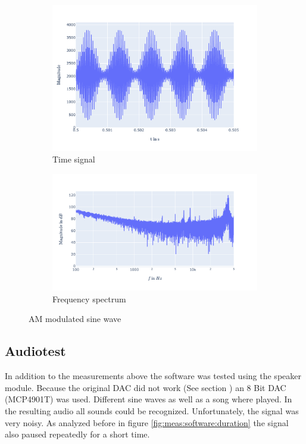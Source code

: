 \begin{figure}
  \centering
  \begin{subfigure}[b]{0.8\textwidth}
    \includegraphics[width=\textwidth]{src/assets/pictures/measurements/software_am_time.pdf}
    \caption{Time signal}
    \label{fig:meas:software:am_time}
  \end{subfigure}
  \hfill
  \begin{subfigure}[b]{0.8\textwidth}
    \includegraphics[width=\textwidth]{src/assets/pictures/measurements/software_am_frequency.pdf}
    \caption{Frequency spectrum}
    \label{fig:meas:software:am_freq}
  \end{subfigure}
  \caption{AM modulated sine wave}
  \label{fig:meas:software:am}
\end{figure}
%
\subsection{Audiotest}

In addition to the measurements above the software was tested using the speaker module. Because the original DAC did not work (See section ) an 8 Bit DAC (MCP4901T) was used. Different sine waves as well as a song where played. In the resulting audio all sounds could be recognized. Unfortunately, the signal was very noisy. As analyzed before in figure \ref{fig:meas:software:duration} the signal also paused repeatedly for a short time.